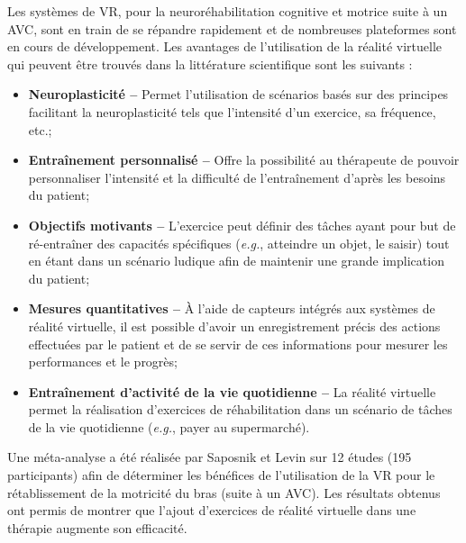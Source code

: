 	Les systèmes de VR, pour la neuroréhabilitation cognitive et motrice suite à un AVC, sont en train de se répandre rapidement et de nombreuses plateformes sont en cours de développement. 
	Les avantages de l'utilisation de la réalité virtuelle qui peuvent être trouvés dans la littérature scientifique sont les suivants \cite{VARSG4HC1}:
	\begin{itemize}
		\item \textbf{Neuroplasticité --} Permet l'utilisation de scénarios basés sur des principes facilitant la neuroplasticité tels que l'intensité d'un exercice, sa fréquence, etc.;
		\item \textbf{Entraînement personnalisé --} Offre la possibilité au thérapeute de pouvoir personnaliser l'intensité et la difficulté de l'entraînement d'après les besoins du patient;
		\item \textbf{Objectifs motivants --} L'exercice peut définir des tâches ayant pour but de ré-entraîner des capacités spécifiques (\textit{e.g.}, atteindre un objet, le saisir) tout en étant dans un scénario ludique afin de maintenir une grande implication du patient; %
		\item \textbf{Mesures quantitatives --} À l'aide de capteurs intégrés aux systèmes de réalité virtuelle, il est possible d'avoir un enregistrement précis des actions effectuées par le patient et de se servir de ces informations pour mesurer les performances et le progrès;
		\item \textbf{Entraînement d'activité de la vie quotidienne --} La réalité virtuelle permet la réalisation d'exercices de réhabilitation dans un scénario de tâches de la vie quotidienne (\textit{e.g.}, payer au supermarché).	
	\end{itemize}

	Une méta-analyse a été réalisée par Saposnik et Levin \cite{Saposnik_VR4StrokeRehab} sur 12 études (195 participants) afin de déterminer les bénéfices de l'utilisation de la VR pour le rétablissement de la motricité du bras (suite à un AVC). Les résultats obtenus ont permis de montrer que l'ajout d'exercices de réalité virtuelle dans une thérapie augmente son efficacité.
	\\
	
